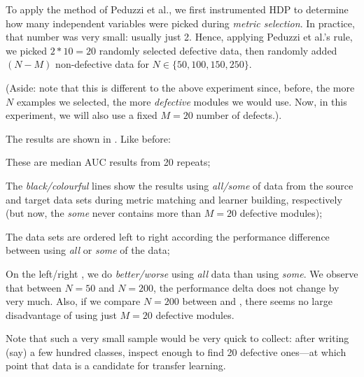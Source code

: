  To apply the method of Peduzzi et al., we first instrumented HDP to determine how many
  independent variables were picked during {\em metric  selection}. In practice, that number
  was very small: usually just 2. Hence, applying  Peduzzi et al.'s rule, we picked $2*10=20$
  randomly selected defective data, then randomly added $(N-M)$ non-defective data for $N\in \{50,100,150,250\}$.

  (Aside: note that this is different to the above experiment since, before, the more $N$ examples
  we selected, the more {\em defective} modules we would use. Now, in this experiment, we will also
  use a fixed $M=20$ number of defects.).

  The results are shown in . Like before:
  \bi
  \item These are median AUC results from 20 repeats;
\item
  The {\em black/colourful} lines show the results using {\em all/some} of  data from
  the source and target data sets during metric matching and learner building, respectively
  (but now, the {\em some} never contains more than $M=20$ defective modules);
\item
  The data sets are ordered left to right according
  the performance difference between using
   {\em all} or {\em some} of the data;
   \item
     On the left/right ,  we do {\em better/worse} using
  {\em all} data than using {\em some}.
  \ei
  We observe that between $N=50$ and $N=200$, the performance delta
  does not change by very much. Also, if we compare $N=200$ between 
  and , there seems no large disadvantage of using just
  $M=20$ defective modules.

  Note that such a very small sample would be very quick to collect: after writing (say) a few
  hundred classes, inspect enough to find 20 defective ones---at which point that data is a candidate
  for transfer learning.
